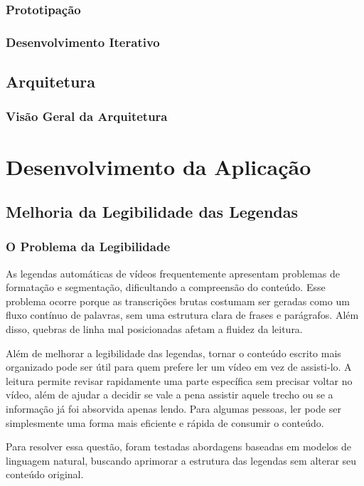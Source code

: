 \documentclass[tcc,capa]{texufpel}
\begin{document}
\subsection{Prototipação}
\subsection{Desenvolvimento Iterativo}

\section{Arquitetura }

\subsection{Visão Geral da Arquitetura}


\chapter{Desenvolvimento da Aplicação}

\section{Melhoria da Legibilidade das Legendas}

\subsection{O Problema da Legibilidade}
As legendas automáticas de vídeos frequentemente apresentam problemas de formatação e segmentação, dificultando a compreensão do conteúdo. Esse problema ocorre porque as transcrições brutas costumam ser geradas como um fluxo contínuo de palavras, sem uma estrutura clara de frases e parágrafos. Além disso, quebras de linha mal posicionadas afetam a fluidez da leitura.

Além de melhorar a legibilidade das legendas, tornar o conteúdo escrito mais organizado pode ser útil para quem prefere ler um vídeo em vez de assisti-lo. A leitura permite revisar rapidamente uma parte específica sem precisar voltar no vídeo, além de ajudar a decidir se vale a pena assistir aquele trecho ou se a informação já foi absorvida apenas lendo. Para algumas pessoas, ler pode ser simplesmente uma forma mais eficiente e rápida de consumir o conteúdo.

Para resolver essa questão, foram testadas abordagens baseadas em modelos de linguagem natural, buscando aprimorar a estrutura das legendas sem alterar seu conteúdo original.
\end{document}
